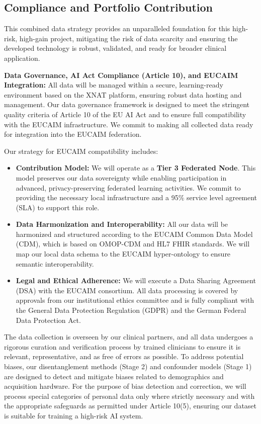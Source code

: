 \documentclass[11pt, a4paper]{article}
\begin{document}
\subsection{Compliance and Portfolio Contribution}
This combined data strategy provides an unparalleled foundation for this high-risk, high-gain project, mitigating the risk of data scarcity and ensuring the developed technology is robust, validated, and ready for broader clinical application.

\textbf{Data Governance, AI Act Compliance (Article 10), and EUCAIM Integration:} All data will be managed within a secure, learning-ready environment based on the XNAT platform, ensuring robust data hosting and management. Our data governance framework is designed to meet the stringent quality criteria of Article 10 of the EU AI Act and to ensure full compatibility with the EUCAIM infrastructure. We commit to making all collected data ready for integration into the EUCAIM federation.

Our strategy for EUCAIM compatibility includes:
\begin{itemize}
    \item \textbf{Contribution Model:} We will operate as a \textbf{Tier 3 Federated Node}. This model preserves our data sovereignty while enabling participation in advanced, privacy-preserving federated learning activities. We commit to providing the necessary local infrastructure and a 95\% service level agreement (SLA) to support this role.
    \item \textbf{Data Harmonization and Interoperability:} All our data will be harmonized and structured according to the EUCAIM Common Data Model (CDM), which is based on OMOP-CDM and HL7 FHIR standards. We will map our local data schema to the EUCAIM hyper-ontology to ensure semantic interoperability.
    \item \textbf{Legal and Ethical Adherence:} We will execute a Data Sharing Agreement (DSA) with the EUCAIM consortium. All data processing is covered by approvals from our institutional ethics committee and is fully compliant with the General Data Protection Regulation (GDPR) and the German Federal Data Protection Act.
\end{itemize}

The data collection is overseen by our clinical partners, and all data undergoes a rigorous curation and verification process by trained clinicians to ensure it is relevant, representative, and as free of errors as possible. To address potential biases, our disentanglement methods (Stage 2) and confounder models (Stage 1) are designed to detect and mitigate biases related to demographics and acquisition hardware. For the purpose of bias detection and correction, we will process special categories of personal data only where strictly necessary and with the appropriate safeguards as permitted under Article 10(5), ensuring our dataset is suitable for training a high-risk AI system.
\end{document}
